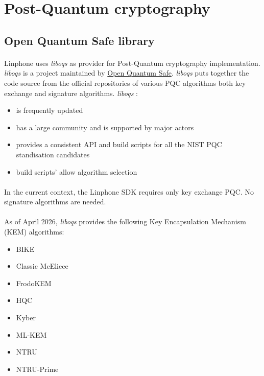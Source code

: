 \documentclass[a4paper,11pt]{article}
\begin{document}
\newpage
\section{Post-Quantum cryptography}
\subsection{Open Quantum Safe library}
\paragraph*{}Linphone uses  \textit{liboqs}\citep{liboqs} as provider for Post-Quantum cryptography implementation. \textit{liboqs} is a project maintained by \href{https://openquantumsafe.org/}{Open Quantum Safe}. \textit{liboqs} puts together the code source from the official repositories of various PQC algorithms both key exchange and signature algorithms. \textit{liboqs} :
\begin{itemize}
  \item is frequently updated
  \item has a large community and is supported by major actors
  \item provides a consistent API and build scripts for all the NIST PQC standisation candidates
  \item build scripts' allow algorithm selection
\end{itemize}

\paragraph*{}In the current context, the Linphone SDK requires only key exchange PQC. No signature algorithms are needed.

\paragraph*{}As of April 2026, \textit{liboqs} provides the following Key Encapsulation Mechanism (KEM) algorithms:
\begin{itemize}
  \item BIKE
  \item Classic McEliece
  \item FrodoKEM
  \item HQC
  \item Kyber
  \item ML-KEM
  \item NTRU
  \item NTRU-Prime
\end{itemize}
\end{document}
